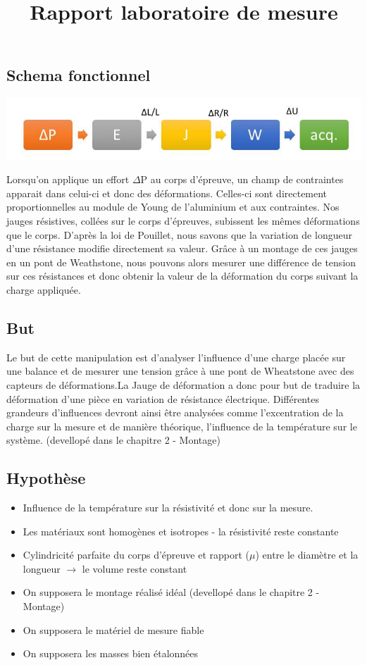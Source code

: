 \documentclass[10pt,a4paper]{report}
\begin{document}
\title{Rapport laboratoire de mesure}
\chapter{}
\section{Schema fonctionnel}
\begin{center}
\includegraphics[scale=0.3]{image1.jpg} 
\end{center}

Lorsqu'on applique un effort $\Delta$P au corps d'épreuve, un champ de contraintes apparait dans celui-ci et donc des déformations. Celles-ci sont directement proportionnelles au module de Young de l'aluminium et aux contraintes. Nos jauges résistives, collées sur le corps d'épreuves, subissent les mêmes déformations que le corps. D'après la loi de Pouillet, nous savons que la variation de longueur d'une résistance modifie directement sa valeur. Grâce à un montage de ces jauges en un pont de Weathstone, nous pouvons alors mesurer une différence de tension sur ces résistances et donc obtenir la valeur de la déformation du corps suivant la charge appliquée.
\section{But}
Le but de cette manipulation est d'analyser l'influence d'une charge placée sur une balance et de mesurer une tension grâce à une pont de Wheatstone avec des capteurs de déformations.La Jauge de déformation a donc pour but de traduire la déformation d'une pièce en variation de résistance électrique. Différentes grandeurs d'influences devront ainsi être analysées comme l'excentration de la charge sur la mesure et de manière théorique, l'influence de la température sur le système. (devellopé dans le chapitre 2 - Montage)
\section{Hypothèse}
\begin{itemize}
\item Influence de la température sur la résistivité et donc sur la mesure.
\item Les matériaux sont homogènes et isotropes - la résistivité reste constante
\item Cylindricité parfaite du corps d'épreuve et rapport ($\mu$) entre le diamètre et la longueur $\rightarrow$ le volume reste constant
\item On supposera le montage réalisé idéal (devellopé dans le chapitre 2 - Montage)
\item On supposera le matériel de mesure fiable
\item On supposera les masses bien étalonnées
\end{itemize}	
\end{document}
